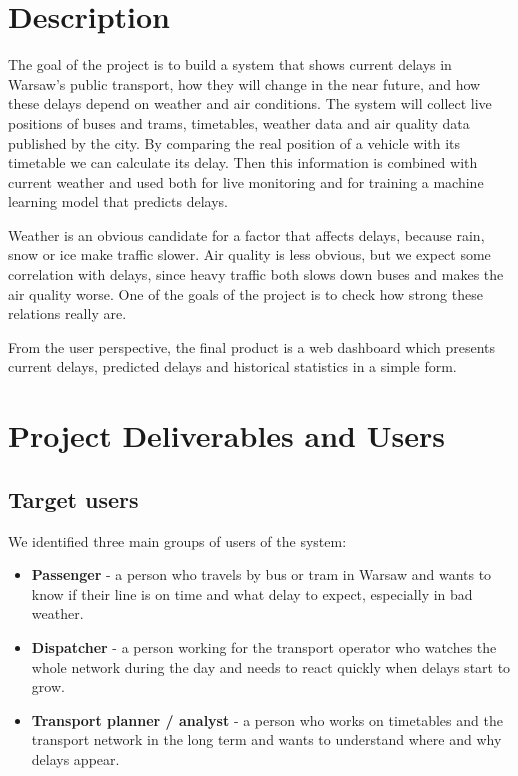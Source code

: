 \documentclass[11pt]{article}
\begin{document}
\section{Description}

The goal of the project is to build a system that shows current delays in Warsaw's public transport, how they will change in the near future, and how these delays depend on weather and air conditions. The system will collect live positions of buses and trams, timetables, weather data and air quality data published by the city. By comparing the real position of a vehicle with its timetable we can calculate its delay. Then this information is combined with current weather and used both for live monitoring and for training a machine learning model that predicts delays.

Weather is an obvious candidate for a factor that affects delays, because rain, snow or ice make traffic slower. Air quality is less obvious, but we expect some correlation with delays, since heavy traffic both slows down buses and makes the air quality worse. One of the goals of the project is to check how strong these relations really are.

From the user perspective, the final product is a web dashboard which presents current delays, predicted delays and historical statistics in a simple form.

\section{Project Deliverables and Users}

\subsection{Target users}

We identified three main groups of users of the system:
\begin{itemize}
    \item \textbf{Passenger} - a person who travels by bus or tram in Warsaw and wants to know if their line is on time and what delay to expect, especially in bad weather.
    \item \textbf{Dispatcher} - a person working for the transport operator who watches the whole network during the day and needs to react quickly when delays start to grow.
    \item \textbf{Transport planner / analyst} - a person who works on timetables and the transport network in the long term and wants to understand where and why delays appear.
\end{itemize}
\end{document}
